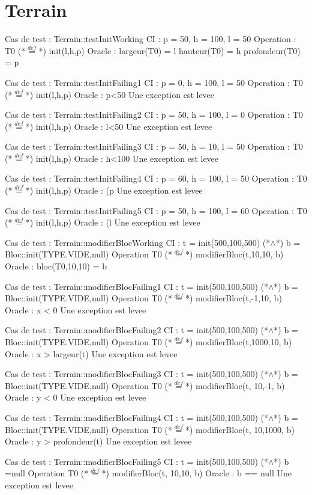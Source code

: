 \documentclass[a4paper, 11pt, notitlepage]{report}
\begin{document}
\section{Terrain}
\begin{Test}
Cas de test  : Terrain::testInitWorking
CI : p = 50, h = 100, l = 50
Operation : T0 (*$\stackrel{def}{=}$*) init(l,h,p)
Oracle :
	largeur(T0) = l
	hauteur(T0) = h
	profondeur(T0) = p

Cas de test  : Terrain::testInitFailing1
CI :  p = 0, h = 100, l = 50
Operation : T0 (*$\stackrel{def}{=}$*) init(l,h,p)
Oracle :
	p<50
	Une exception est levee

Cas de test  : Terrain::testInitFailing2
CI :  p = 50, h = 100, l = 0
Operation : T0 (*$\stackrel{def}{=}$*) init(l,h,p)
Oracle :
	l<50
	Une exception est levee

Cas de test  : Terrain::testInitFailing3
CI :  p = 50, h = 10, l = 50
Operation : T0 (*$\stackrel{def}{=}$*) init(l,h,p)
Oracle :
	h<100
	Une exception est levee

Cas de test  : Terrain::testInitFailing4
CI :  p = 60, h = 100, l = 50
Operation : T0 (*$\stackrel{def}{=}$*) init(l,h,p)
Oracle :
	(p%
	Une exception est levee

Cas de test  : Terrain::testInitFailing5
CI :  p = 50, h = 100, l = 60
Operation : T0 (*$\stackrel{def}{=}$*) init(l,h,p)
Oracle :
	(l%
	Une exception est levee

Cas de test : Terrain::modifierBlocWorking
CI : t = init(500,100,500) (*$\land$*) b = Bloc::init(TYPE.VIDE,null)
Operation T0 (*$\stackrel{def}{=}$*) modifierBloc(t,10,10, b)
Oracle :
	bloc(T0,10,10) = b

Cas de test : Terrain::modifierBlocFailing1
CI : t = init(500,100,500) (*$\land$*) b = Bloc::init(TYPE.VIDE,null)
Operation T0 (*$\stackrel{def}{=}$*) modifierBloc(t,-1,10, b)
Oracle :
	x < 0
	Une exception est levee

Cas de test : Terrain::modifierBlocFailing2
CI : t = init(500,100,500) (*$\land$*) b = Bloc::init(TYPE.VIDE,null)
Operation T0 (*$\stackrel{def}{=}$*) modifierBloc(t,1000,10, b)
Oracle :
	x > largeur(t)
	Une exception est levee

Cas de test : Terrain::modifierBlocFailing3
CI : t = init(500,100,500) (*$\land$*) b = Bloc::init(TYPE.VIDE,null)
Operation T0 (*$\stackrel{def}{=}$*) modifierBloc(t, 10,-1, b)
Oracle :
	y < 0
	Une exception est levee 
 
Cas de test : Terrain::modifierBlocFailing4
CI : t = init(500,100,500) (*$\land$*) b = Bloc::init(TYPE.VIDE,null)
Operation T0 (*$\stackrel{def}{=}$*) modifierBloc(t, 10,1000, b)
Oracle :
	y > profondeur(t)
	Une exception est levee 

Cas de test : Terrain::modifierBlocFailing5
CI : t = init(500,100,500) (*$\land$*) b =null
Operation T0 (*$\stackrel{def}{=}$*) modifierBloc(t, 10,10, b)
Oracle :
	b == null
	Une exception est levee 

	    
\end{Test}
\end{document}
